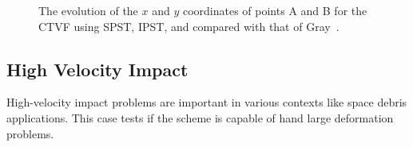 \begin{figure}
\begin{subfigure}{0.48\textwidth}
    \label{fig:rings-compare-y}
  \end{subfigure}
  \caption{The evolution of the $x$ and $y$ coordinates of points A and B for
    the CTVF using SPST, IPST, and compared with that of
    Gray~\citep{gray-ed-2001}.}
\label{fig:rings_compare}
\end{figure}


\FloatBarrier%
\subsection{High Velocity Impact}

High-velocity impact problems are important in various contexts like space
debris applications. This case tests if the scheme is capable of hand large
deformation problems.


